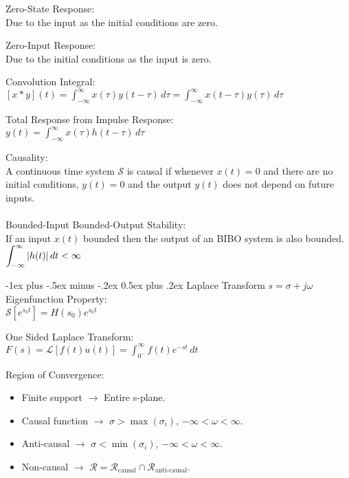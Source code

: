 \documentclass[12pt,landscape]{article}
\makeatletter
\renewcommand{\section}{\@startsection{section}{1}{0mm}%
                                {-1ex plus -.5ex minus -.2ex}%
                                {0.5ex plus .2ex}%
                                {\normalfont\normalsize\bfseries}}
\newcommand{\tab}{\hspace{.02\textwidth}}
\newcommand{\ds}{\displaystyle}
\makeatother
\begin{document}
\begin{multicols*}{3}
Zero-State Response:\\
\tab Due to the input as the initial conditions are zero.

Zero-Input Response:\\
\tab Due to the initial conditions as the input is zero.

Convolution Integral:\\
\tab $\ds [x * y](t) = \int_{-\infty}^{\infty}x(\tau)y(t-\tau)\,d\tau = \int_{-\infty}^{\infty}x(t - \tau)y(\tau)\,d\tau$

Total Response from Impulse Response:\\
\tab $\ds y(t) = \int_{-\infty}^{\infty}x(\tau)h(t-\tau)\,d\tau$

Causality:\\
\tab A continuous time system $\mathcal{S}$ is causal if whenever $x(t) = 0$ and there are no initial conditions, $y(t) = 0$ and the output $y(t)$ does not depend on future inputs.
\\~\\
Bounded-Input Bounded-Output Stability:\\
\tab If an input $x(t)$ bounded then the output of an BIBO system is also bounded.\\
\tab $\ds \int_{-\infty}^{\infty} \abs{h(t)}\,dt < \infty$

\section{Laplace Transform}
$s = \sigma + j\omega$\\

Eigenfunction Property:\\
\tab $\mathcal{S}[e^{s_0t}] = H(s_0)e^{s_0t}$

One Sided Laplace Transform:\\
\tab $\ds F(s) = \mathcal{L}[f(t)u(t)] = \int_{0^-}^{\infty}f(t)e^{-st}\,dt$

Region of Convergence:\\
\begin{itemize}
	\itemsep0em
	\item Finite support $\rightarrow$ Entire s-plane.
	\item Causal function $\rightarrow$ $\sigma > \max(\sigma_i)$,  $-\infty < \omega < \infty$.
	\item Anti-causal $\rightarrow$ $\sigma < \min(\sigma_i)$,  $-\infty < \omega < \infty$.
	\item Non-causal $\rightarrow$ $\mathcal{R} = \mathcal{R}_\text{causal} \cap \mathcal{R}_\text{anti-causal}$.
\end{itemize}


\end{multicols*}
\end{document}
